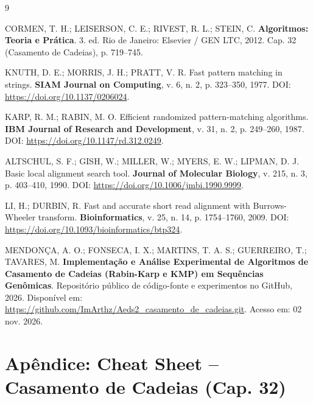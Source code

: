 \documentclass[12pt,a4paper]{article}
\begin{document}
\begin{thebibliography}{9}

CORMEN, T. H.; LEISERSON, C. E.; RIVEST, R. L.; STEIN, C. \textbf{Algoritmos: Teoria e Pr\'atica}. 3. ed. Rio de Janeiro: Elsevier / GEN LTC, 2012. Cap. 32 (Casamento de Cadeias), p. 719--745.

KNUTH, D. E.; MORRIS, J. H.; PRATT, V. R. Fast pattern matching in strings. \textbf{SIAM Journal on Computing}, v. 6, n. 2, p. 323--350, 1977. DOI: \url{https://doi.org/10.1137/0206024}.

KARP, R. M.; RABIN, M. O. Efficient randomized pattern-matching algorithms. \textbf{IBM Journal of Research and Development}, v. 31, n. 2, p. 249--260, 1987. DOI: \url{https://doi.org/10.1147/rd.312.0249}.

ALTSCHUL, S. F.; GISH, W.; MILLER, W.; MYERS, E. W.; LIPMAN, D. J. Basic local alignment search tool. \textbf{Journal of Molecular Biology}, v. 215, n. 3, p. 403--410, 1990. DOI: \url{https://doi.org/10.1006/jmbi.1990.9999}.

LI, H.; DURBIN, R. Fast and accurate short read alignment with Burrows-Wheeler transform. \textbf{Bioinformatics}, v. 25, n. 14, p. 1754--1760, 2009. DOI: \url{https://doi.org/10.1093/bioinformatics/btp324}.


MENDON\c{C}A, A. O.; FONSECA, I. X.; MARTINS, T. A. S.; GUERREIRO, T.; TAVARES, M. \textbf{Implementa\c{c}\~ao e An\'alise Experimental de Algoritmos de Casamento de Cadeias (Rabin-Karp e KMP) em Sequ\^encias Gen\^omicas}. Reposit\'orio p\'ublico de c\'odigo-fonte e experimentos no GitHub, 2026. Dispon\'ivel em: \url{https://github.com/ImArthz/Aeds2_casamento_de_cadeias.git}. Acesso em: 02 nov. 2026.

\end{thebibliography}

\newpage

\appendix{}
\section*{Ap\^endice: Cheat Sheet -- Casamento de Cadeias (Cap. 32)}
\end{document}
